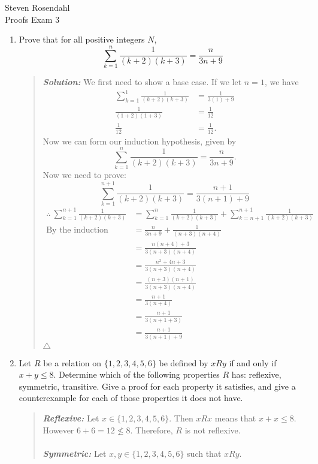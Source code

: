 \documentclass{article}
\newcommand{\SLN}{\indent\textit{\textbf{Solution: }}}
\begin{document}
\noindent Steven Rosendahl\\
Proofs Exam 3
\vspace{1cm}
\begin{enumerate}
\item Prove that for all positive integers $N$,
\[
\sum_{k=1}^{n}\frac{1}{(k+2)(k+3)} = \frac{n}{3n + 9}
\]
\begin{quote}
\SLN
\noindent We first need to show a base case. If we let $n = 1$, we have
\begin{align*}
\sum_{k=1}^{1}\frac{1}{(k+2)(k+3)} &= \frac{1}{3(1) + 9}\\
\frac{1}{(1 + 2)(1 + 3)} &= \frac{1}{12}\\
\frac{1}{12} &= \frac{1}{12}.
\end{align*}
\noindent Now we can form our induction hypothesis, given by
\[\sum_{k=1}^{n}\frac{1}{(k+2)(k+3)} = \frac{n}{3n + 9}.\]
\noindent Now we need to prove:
\[
\sum_{k=1}^{n + 1}\frac{1}{(k+2)(k+3)} = \frac{n + 1}{3(n + 1) + 9}
\]
\begin{align*}
\therefore\ \sum_{k=1}^{n + 1}\frac{1}{(k+2)(k+3)} &= \sum_{k=1}^{n}\frac{1}{(k+2)(k+3)} + \sum_{k=n+1}^{n+1}\frac{1}{(k+2)(k+3)}\\
\text{By the induction hypothesis, }&= \frac{n}{3n+9} + \frac{1}{(n+3)(n+4)}\\
&= \frac{n(n+4) + 3}{3(n+3)(n+4)}\\
&= \frac{n^{2} + 4n + 3}{3(n+3)(n+4)}\\
&= \frac{(n+3)(n+1)}{3(n+3)(n+4)}\\
&= \frac{n+1}{3(n+4)}\\
&= \frac{n+1}{3(n + 1 + 3)}\\
&= \frac{n+1}{3(n+1) + 9}
\end{align*}
$\triangle$
\end{quote}
\newpage
\item Let $R$ be a relation on $\{1,2,3,4,5,6\}$ be defined by $xRy$ if and only if $x + y \leq 8$. Determine which of the following properties $R$ has: reflexive, symmetric, transitive. Give a proof for each property it satisfies, and give a counterexample for each of those properties it does not have.
\begin{quote}
\textit{\textbf{Reflexive: }} Let $x \in \{1,2,3,4,5,6\}$.
Then $xRx$ means that $x + x \leq 8$.
However $6 + 6 = 12 \nleq 8$. Therefore, $R$ is not reflexive.\\\\
\textit{\textbf{Symmetric: }} Let $x,y \in \{1,2,3,4,5,6\}$ such that $xRy$.

\end{quote}
\end{enumerate}
\end{document}
